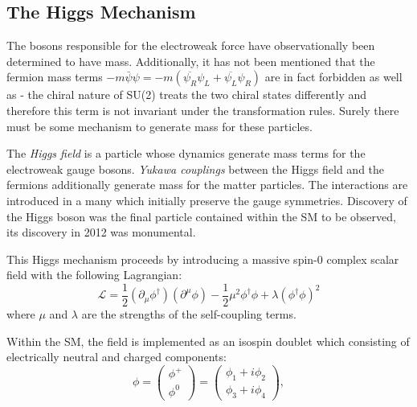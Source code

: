 \subsection{The Higgs Mechanism}

The bosons responsible for the electroweak force have observationally been determined to have mass. Additionally, it has not been mentioned that the fermion mass terms $-m\bar{\psi}\psi = -m( \overline{\psi_{R}} \psi_{L} + \overline{\psi_{L}}\psi_{R})$ are in fact forbidden as well as - the chiral nature of SU(2) treats the two chiral states differently and therefore this term is not invariant under the transformation rules. Surely there must be some mechanism to generate mass for these particles.

The \textit{Higgs field} is a particle whose dynamics generate mass terms for the electroweak gauge bosons. \textit{Yukawa couplings} between the Higgs field and the fermions additionally generate mass for the matter particles. The interactions are introduced in a many which initially preserve the gauge symmetries. Discovery of the Higgs boson was the final particle contained within the SM to be observed, its discovery in 2012 was monumental.\cite{higgsdisc}

This Higgs mechanism proceeds by introducing a massive spin-0 complex scalar field with the following Lagrangian:
\begin{equation}
\label{higgslag}
\mathcal{L} = \frac{1}{2} (\partial_{\mu}\phi^{\dagger})(\partial^{\mu}\phi) - \frac{1}{2}\mu^{2} \phi^{\dagger}\phi + \lambda(\phi^{\dagger}\phi)^{2}
\end{equation}
where $\mu$ and $\lambda$ are the strengths of the self-coupling terms.

Within the SM, the field is implemented as an isospin doublet which consisting of electrically neutral and charged components:
\begin{equation}
\phi = \begin{pmatrix} \phi^{+} \\ \phi^{0} \end{pmatrix} = \begin{pmatrix} \phi_{1} + i\phi_{2} \\  \phi_{3} + i\phi_{4} \end{pmatrix},
\end{equation}

